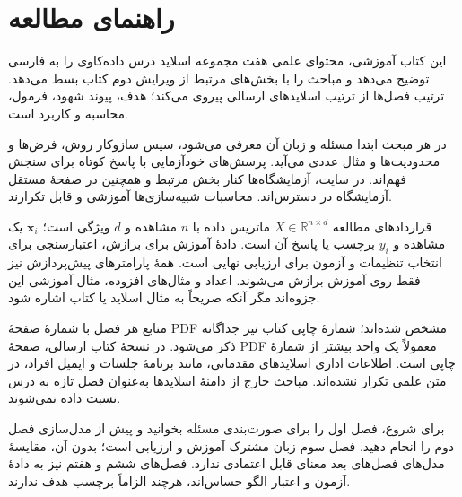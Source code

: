 \chapter*{راهنمای مطالعه}
این کتاب آموزشی، محتوای علمی هفت مجموعه اسلاید درس داده‌کاوی را به فارسی توضیح می‌دهد و مباحث را با بخش‌های مرتبط از ویرایش دوم کتاب  بسط می‌دهد. ترتیب فصل‌ها از ترتیب اسلایدهای ارسالی پیروی می‌کند؛ هدف، پیوند شهود، فرمول، محاسبه و کاربرد است.

در هر مبحث ابتدا مسئله و زبان آن معرفی می‌شود، سپس سازوکار روش، فرض‌ها و محدودیت‌ها و مثال عددی می‌آید. پرسش‌های خودآزمایی با پاسخ کوتاه برای سنجش فهم‌اند. در سایت، آزمایشگاه‌ها کنار بخش مرتبط و همچنین در صفحهٔ مستقل آزمایشگاه در دسترس‌اند. محاسبات شبیه‌سازی‌ها آموزشی و قابل تکرارند.

\begin{important}{قراردادهای مطالعه}
$X\in\mathbb R^{n\times d}$ ماتریس داده با $n$ مشاهده و $d$ ویژگی است؛ $\mathbf x_i$ یک مشاهده و $y_i$ برچسب یا پاسخ آن است. دادهٔ آموزش برای برازش، اعتبارسنجی برای انتخاب تنظیمات و آزمون برای ارزیابی نهایی است. همهٔ پارامترهای پیش‌پردازش نیز فقط روی آموزش برازش می‌شوند. اعداد و مثال‌های افزوده، مثال آموزشی این جزوه‌اند مگر آنکه صریحاً به مثال اسلاید یا کتاب اشاره شود.
\end{important}

منابع هر فصل با شمارهٔ صفحهٔ PDF مشخص شده‌اند؛ شمارهٔ چاپی کتاب نیز جداگانه ذکر می‌شود. در نسخهٔ کتاب ارسالی، صفحهٔ PDF معمولاً یک واحد بیشتر از شمارهٔ چاپی است. اطلاعات اداری اسلایدهای مقدماتی، مانند برنامهٔ جلسات و ایمیل افراد، در متن علمی تکرار نشده‌اند. مباحث خارج از دامنهٔ اسلایدها به‌عنوان فصل تازه به درس نسبت داده نمی‌شوند.

برای شروع، فصل اول را برای صورت‌بندی مسئله بخوانید و پیش از مدل‌سازی فصل دوم را انجام دهید. فصل سوم زبان مشترک آموزش و ارزیابی است؛ بدون آن، مقایسهٔ مدل‌های فصل‌های بعد معنای قابل اعتمادی ندارد. فصل‌های ششم و هفتم نیز به دادهٔ آزمون و اعتبار الگو حساس‌اند، هرچند الزاماً برچسب هدف ندارند.
